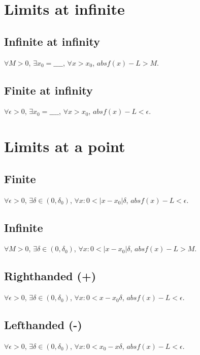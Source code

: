 \documentclass[12pt]{article}
\newcommand{\abs}  [1]{\left|       #1 \right|      }
\begin{document}
\begin{multicols}{2}

\section*{Limits at infinite}

\subsection*{Infinite at infinity}
$\forall M > 0$, $\exists x_0 = \_\_\_\_$, $\forall x > x_0$, $abs{f(x) - L} > M$.

\subsection*{Finite at infinity}
$\forall \epsilon > 0$, $\exists x_0 = \_\_\_\_$, $\forall x > x_0$, $abs{f(x) - L} < \epsilon$.



\section*{Limits at a point}

\subsection*{Finite}
$\forall \epsilon > 0$, $\exists \delta \in (0, \delta_0)$, $\forall x : 0 < \abs{x-x_0} \delta$, $abs{f(x) - L} < \epsilon$.

\subsection*{Infinite}
$\forall M > 0$, $\exists \delta \in (0, \delta_0)$, $\forall x : 0 < \abs{x-x_0} \delta$, $abs{f(x) - L} > M$.

\subsection*{Righthanded (+)}
$\forall \epsilon > 0$, $\exists \delta \in (0, \delta_0)$, $\forall x : 0 < x-x_0 \delta$, $abs{f(x) - L} < \epsilon$.

\subsection*{Lefthanded (-)}
$\forall \epsilon > 0$, $\exists \delta \in (0, \delta_0)$, $\forall x : 0 < x_0-x \delta$, $abs{f(x) - L} < \epsilon$.



\end{multicols}
\end{document}
